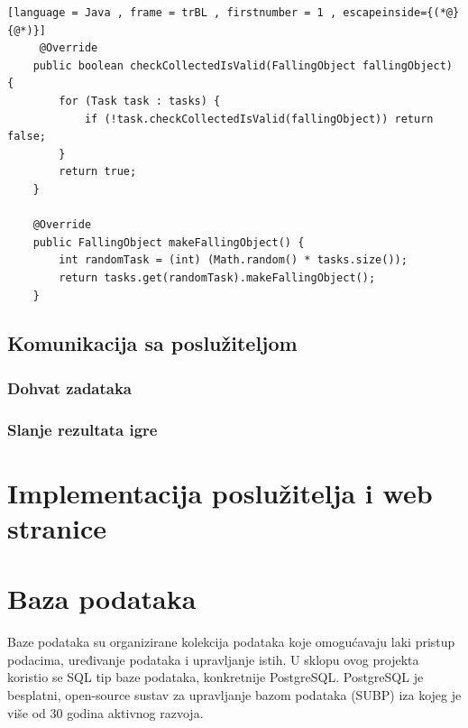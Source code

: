 \documentclass[times, utf8, zavrsni]{fer}
\begin{document}
	\begin{lstlisting}[language = Java , frame = trBL , firstnumber = 1 , escapeinside={(*@}{@*)}]
	 @Override
    public boolean checkCollectedIsValid(FallingObject fallingObject) {
        for (Task task : tasks) {
            if (!task.checkCollectedIsValid(fallingObject)) return false;
        }
        return true;
    }

    @Override
    public FallingObject makeFallingObject() {
        int randomTask = (int) (Math.random() * tasks.size());
        return tasks.get(randomTask).makeFallingObject();
    }
	\end{lstlisting}
	
	\section{Komunikacija sa poslužiteljom}
	\subsection{Dohvat zadataka}

	\subsection{Slanje rezultata igre}
	
\chapter{Implementacija poslužitelja i web stranice}
		
	

\chapter{Baza podataka}
	Baze podataka su organizirane kolekcija podataka koje omogućavaju laki pristup podacima, uređivanje podataka i upravljanje istih. U sklopu ovog projekta koristio se
	SQL tip baze podataka, konkretnije PostgreSQL. PostgreSQL je besplatni, open-source sustav za upravljanje bazom podataka (SUBP) iza kojeg je više od 30 godina aktivnog razvoja.
	
	
\end{document}
